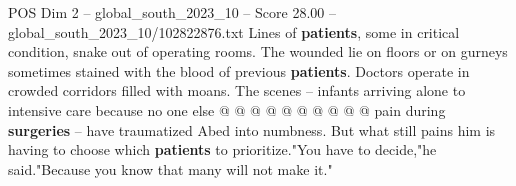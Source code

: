 \begin{textsample}{POS Dim 2 – global\_south\_2023\_10 – Score 28.00 – global\_south\_2023\_10/102822876.txt}
Lines of \textbf{patients}, some in critical condition, snake out of operating rooms.
The wounded lie on floors or on gurneys sometimes stained with the blood of previous \textbf{patients}.
Doctors operate in crowded corridors filled with moans.
The scenes -- infants arriving alone to intensive care because no one else @ @ @ @ @ @ @ @ @ @ pain during \textbf{surgeries} -- have traumatized Abed into numbness.
But what still pains him is having to choose which \textbf{patients} to prioritize."You have to decide,"he said."Because you know that many will not make it."

\end{textsample}
